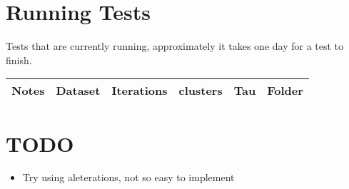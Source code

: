\documentclass[11pt,a4paper]{article}
\begin{document}
\section{Running Tests}
Tests that are currently running, approximately it takes one day for a test to finish.
\begin{table}[h!]
	\begin{tabular}{|l|l|c|c|c|l|} 
      		\rowcolor[gray]{0.7}

		\hline
		Notes & Dataset & Iterations & clusters & Tau & Folder \\ \hline

	\end{tabular}
\end{table}

\section{TODO}

\begin{itemize}
	\item Try using aleterations, not so easy to implement
\end{itemize}
\end{document}
